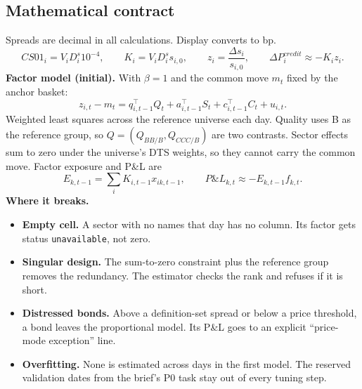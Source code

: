 \documentclass[11pt,a4paper]{article}
\newcommand{\code}[1]{\texttt{\small #1}}
\begin{document}
\subsection{Mathematical contract}
Spreads are decimal in all calculations. Display converts to bp.
\[
CS01_i = V_i D^s_i 10^{-4},\qquad K_i = V_i D^s_i s_{i,0},\qquad z_i = \frac{\Delta s_i}{s_{i,0}},\qquad \Delta P^{credit}_i \approx -K_i z_i .
\]
\textbf{Factor model (initial).} With $\beta=1$ and the common move $m_t$ fixed by the anchor basket:
\[
z_{i,t} - m_t = q_{i,t-1}^{\top}Q_t + a_{i,t-1}^{\top}S_t + c_{i,t-1}^{\top}C_t + u_{i,t}.
\]
Weighted least squares across the reference universe each day. Quality uses B as the reference group, so $Q = (Q_{BB/B}, Q_{CCC/B})$ are two contrasts. Sector effects sum to zero under the universe's DTS weights, so they cannot carry the common move. Factor exposure and P\&L are
\[
E_{k,t-1} = \sum_i K_{i,t-1} x_{ik,t-1}, \qquad P\&L_{k,t} \approx -E_{k,t-1} f_{k,t}.
\]
\textbf{Where it breaks.}
\begin{itemize}
\item \textbf{Empty cell.} A sector with no names that day has no column. Its factor gets status \code{unavailable}, not zero.
\item \textbf{Singular design.} The sum-to-zero constraint plus the reference group removes the redundancy. The estimator checks the rank and refuses if it is short.
\item \textbf{Distressed bonds.} Above a definition-set spread or below a price threshold, a bond leaves the proportional model. Its P\&L goes to an explicit ``price-mode exception'' line.
\item \textbf{Overfitting.} None is estimated across days in the first model. The reserved validation dates from the brief's P0 task stay out of every tuning step.
\end{itemize}
\end{document}
